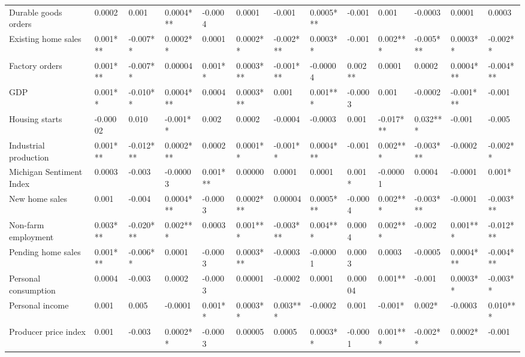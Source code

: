 \begin{landscape}
\begin{table}[]
{\begin{tabular}{lllllllllllll}
Durable goods orders     & 0.0002   & 0.001     & 0.0004***  & -0.0004   & 0.0001     & -0.001    & 0.0005*** & -0.001   & 0.001     & -0.0003   & 0.0001    & 0.0003    \\
Existing home sales      & 0.001*** & -0.007**  & 0.0002**   & 0.0001    & 0.0002**   & -0.002*** & 0.0003**  & -0.001   & 0.002***  & -0.005*** & 0.0003**  & -0.002**  \\
Factory orders           & 0.001*** & -0.007**  & 0.00004    & 0.001**   & 0.0003***  & -0.001*** & -0.00004  & 0.002**  & 0.0001    & 0.0002    & 0.0004*** & -0.004*** \\
GDP                      & 0.001**  & -0.010**  & 0.0004***  & 0.0004    & 0.0003***  & 0.001     & 0.001***  & -0.0003  & 0.001     & -0.0002   & -0.001*** & -0.001    \\
Housing starts           & -0.00002 & 0.010     & -0.001**   & 0.002     & 0.0002     & -0.0004   & -0.0003   & 0.001    & -0.017*** & 0.032***  & -0.001    & -0.005    \\
Industrial production    & 0.001*** & -0.012*** & 0.0002***  & 0.0002    & 0.0001**   & -0.001**  & 0.0004*** & -0.001   & 0.002***  & -0.003*** & -0.0002   & -0.002**  \\
Michigan Sentiment Index & 0.0003   & -0.003    & -0.00003   & 0.001***  & 0.00000    & 0.0001    & 0.0001    & 0.001*   & -0.00001  & 0.0004    & -0.0001   & 0.001*    \\
New home sales           & 0.001    & -0.004    & 0.0004***  & -0.0003   & 0.0002***  & 0.00004   & 0.0005*** & -0.0004  & 0.002***  & -0.003*** & -0.0001   & -0.003*** \\
Non-farm employment      & 0.003*** & -0.020*** & 0.002***   & 0.0003    & 0.001***   & -0.003*** & 0.004***  & 0.0004   & 0.002***  & -0.002    & 0.001***  & -0.012*** \\
Pending home sales       & 0.001*** & -0.006**  & 0.0001     & -0.0003   & 0.0003***  & -0.0003   & -0.00001  & 0.0003   & 0.0003    & -0.0005   & 0.0004*** & -0.004*** \\
Personal consumption     & 0.0004   & -0.003    & 0.0002     & -0.0003   & 0.00001    & -0.0002   & 0.0001    & 0.00004  & 0.001**   & -0.001    & 0.0003**  & -0.003**  \\
Personal income          & 0.001    & 0.005     & -0.0001    & 0.001**   & 0.0003**   & 0.003***  & -0.0002   & 0.001    & -0.001*   & 0.002*    & -0.0003   & 0.010***  \\
Producer price index     & 0.001    & -0.003    & 0.0002**   & -0.0003   & 0.00005    & 0.0005    & 0.0003**  & -0.0001  & 0.001***  & -0.002**  & 0.0002*   & -0.001    \\

\end{tabular}}
\end{table}
\end{landscape}
